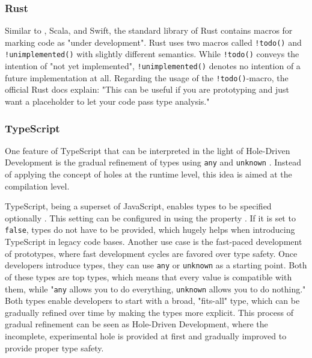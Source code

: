 \subsubsection{Rust}
Similar to \CS, Scala, and Swift, the standard library of Rust contains macros for marking code as "under development".
Rust uses two macros called \texttt{!todo()} \cite{the_rust_project_developers_todo_2023} and \texttt{!unimplemented()} \cite{the_rust_project_developers_unimplemented_2023} with slightly different semantics.
While \texttt{!todo()} conveys the intention of "not yet implemented", \texttt{!unimplemented()} denotes no intention of a future implementation at all.
Regarding the usage of the \texttt{!todo()}-macro, the official Rust docs explain: "This can be useful if you are prototyping and just want a placeholder to let your code pass type analysis." \cite{the_rust_project_developers_todo_2023}

\subsubsection{TypeScript}
One feature of TypeScript that can be interpreted in the light of Hole-Driven Development is the gradual refinement of types using \texttt{any} and \texttt{unknown} \cite{baumgartner_typescript_2023}.
Instead of applying the concept of holes at the runtime level, this idea is aimed at the compilation level.

TypeScript, being a superset of JavaScript, enables types to be specified optionally \cite{baumgartner_typescript_2023}.
This setting can be configured in \texttt{} using the property \texttt{}.
If it is set to \texttt{false}, types do not have to be provided, which hugely helps when introducing TypeScript in legacy code bases.
Another use case is the fast-paced development of prototypes, where fast development cycles are favored over type safety.
Once developers introduce types, they can use \texttt{any} or \texttt{unknown} as a starting point.
Both of these types are top types, which means that every value is compatible with them, while "\texttt{any} allows you to do everything, \texttt{unknown} allows you to do nothing." \cite{baumgartner_typescript_2023}
Both types enable developers to start with a broad, "fits-all" type, which can be gradually refined over time by making the types more explicit.
This process of gradual refinement can be seen as Hole-Driven Development, where the incomplete, experimental hole is provided at first and gradually improved to provide proper type safety.

